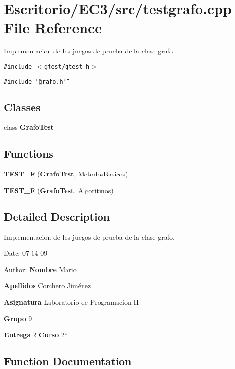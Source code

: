 \section{Escritorio/EC3/src/testgrafo.cpp File Reference}
\label{testgrafo_8cpp}
Implementacion de los juegos de prueba de la clase grafo. 

{\tt \#include $<$gtest/gtest.h$>$}\par
{\tt \#include \char`\"{}grafo.h\char`\"{}}\par
\subsection*{Classes}
\begin{CompactItemize}
\item 
class {\bf GrafoTest}
\end{CompactItemize}
\subsection*{Functions}
\begin{CompactItemize}
\item 
{\bf TEST\_\-F} ({\bf GrafoTest}, MetodosBasicos)
\item 
{\bf TEST\_\-F} ({\bf GrafoTest}, Algoritmos)
\end{CompactItemize}


\subsection{Detailed Description}
Implementacion de los juegos de prueba de la clase grafo. 

\begin{Desc}
\item[Date:]07-04-09 \end{Desc}
\begin{Desc}
\item[Author:]{\bf Nombre} Mario \par
 {\bf Apellidos} Corchero Jiménez \par
 {\bf Asignatura} Laboratorio de Programacion II \par
 {\bf Grupo} 9 \par
 {\bf Entrega} 2 {\bf Curso} 2º \end{Desc}


\subsection{Function Documentation}
